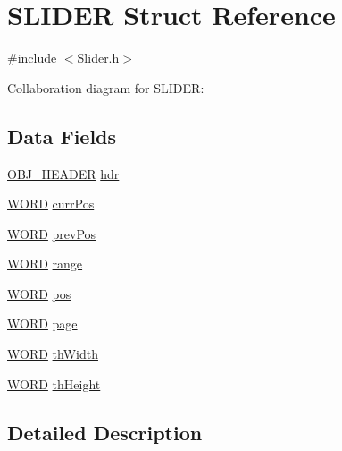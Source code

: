 \hypertarget{struct_s_l_i_d_e_r}{}\section{S\+L\+I\+D\+E\+R Struct Reference}
\label{struct_s_l_i_d_e_r}


{\ttfamily \#include $<$Slider.\+h$>$}



Collaboration diagram for S\+L\+I\+D\+E\+R\+:
\subsection*{Data Fields}
\begin{DoxyCompactItemize}
\item 
\hyperlink{struct_o_b_j___h_e_a_d_e_r}{O\+B\+J\+\_\+\+H\+E\+A\+D\+E\+R} \hyperlink{struct_s_l_i_d_e_r_abeffaf353197a8a64fba6707b68ce0be}{hdr}
\item 
\hyperlink{_generic_type_defs_8h_a2b0e863dadf920709ec53d9088ee7c91}{W\+O\+R\+D} \hyperlink{struct_s_l_i_d_e_r_a9633cf3738cc593dec6c4e03d03c94df}{curr\+Pos}
\item 
\hyperlink{_generic_type_defs_8h_a2b0e863dadf920709ec53d9088ee7c91}{W\+O\+R\+D} \hyperlink{struct_s_l_i_d_e_r_ae5ba3b8b09a4e59718a9e126fab813fe}{prev\+Pos}
\item 
\hyperlink{_generic_type_defs_8h_a2b0e863dadf920709ec53d9088ee7c91}{W\+O\+R\+D} \hyperlink{struct_s_l_i_d_e_r_ab4dbd97dae01a95fd9e0deea02589374}{range}
\item 
\hyperlink{_generic_type_defs_8h_a2b0e863dadf920709ec53d9088ee7c91}{W\+O\+R\+D} \hyperlink{struct_s_l_i_d_e_r_a334282e8dc9fb36245b63e871c6ed478}{pos}
\item 
\hyperlink{_generic_type_defs_8h_a2b0e863dadf920709ec53d9088ee7c91}{W\+O\+R\+D} \hyperlink{struct_s_l_i_d_e_r_aa30cf2ffa7e969cecf6c805e89e3dd43}{page}
\item 
\hyperlink{_generic_type_defs_8h_a2b0e863dadf920709ec53d9088ee7c91}{W\+O\+R\+D} \hyperlink{struct_s_l_i_d_e_r_abf272f22369db6587c47afa50b4ca19e}{th\+Width}
\item 
\hyperlink{_generic_type_defs_8h_a2b0e863dadf920709ec53d9088ee7c91}{W\+O\+R\+D} \hyperlink{struct_s_l_i_d_e_r_a43b8b68f2449553fb168faac121e83c9}{th\+Height}
\end{DoxyCompactItemize}


\subsection{Detailed Description}


